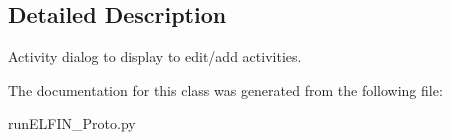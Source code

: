\subsection{Detailed Description}
Activity dialog to display to edit/add activities. 

The documentation for this class was generated from the following file\-:\begin{DoxyCompactItemize}
\item 
run\-E\-L\-F\-I\-N\-\_\-\-Proto.\-py\end{DoxyCompactItemize}
